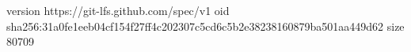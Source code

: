 version https://git-lfs.github.com/spec/v1
oid sha256:31a0fe1eeb04cf154f27ff4c202307c5cd6c5b2e38238160879ba501aa449d62
size 80709
